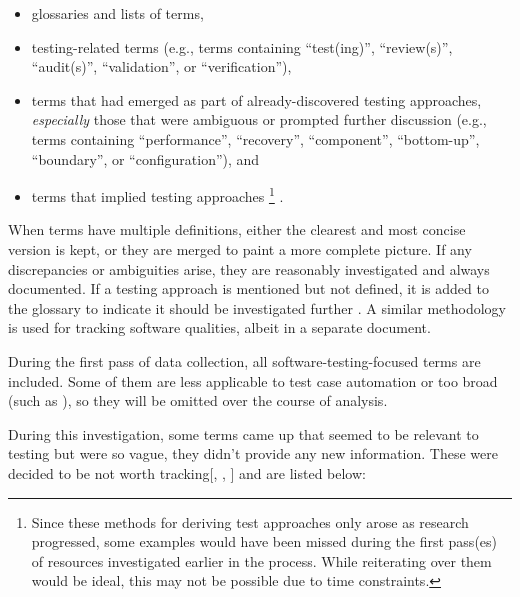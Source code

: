\begin{itemize}
    \item glossaries and lists of terms,
    \item testing-related terms (e.g., terms containing ``test(ing)'',
          \ifnotpaper ``review(s)'', ``audit(s)'', \fi
          ``validation'', or ``verification''),
    \item terms that had emerged as part of already-discovered
          testing approaches, \emph{especially} those that were ambiguous
          or prompted further discussion (e.g., terms containing
          ``performance'', ``recovery'', ``component'', ``bottom-up'',
          \ifnotpaper ``boundary'', \fi or ``configuration''), and
    \item terms that implied testing approaches%
          \ifnotpaper\footnote{
                  Since these methods for deriving test approaches only arose
                  as research progressed, some examples would have been missed
                  during the first pass(es) of resources investigated earlier
                  in the process. While reiterating over them would be ideal,
                  this may not be possible due to time constraints.
              }\fi%
          .
\end{itemize}

When terms have multiple definitions, either the clearest and most concise
version is kept, or they are merged to paint a more complete picture.
If any discrepancies or ambiguities
arise, they are reasonably investigated and always documented. If a
testing approach is mentioned but not defined, it is added to the
glossary to indicate it should be investigated further%
. A similar methodology
is used for tracking software qualities, albeit in a separate
document.

During the first pass of data collection, all software-testing-focused terms
are included. Some of them are less applicable to test case automation
\fi or too
broad (such as \fi), so they
will be omitted over the course of analysis.

\ifnotpaper
    During this investigation, some terms came up that seemed to be relevant to
    testing but were so vague, they didn't provide any new information. These were
    decided to be not worth tracking[, ,
        ] and are listed below:

